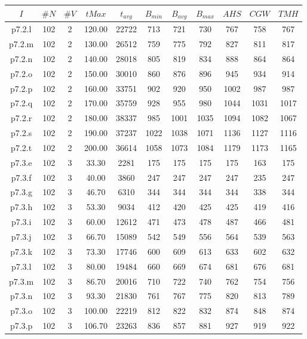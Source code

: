 \begin{center}
\begin{tabular}{ |c|c|c|c|c|c|c|c|c|c|c| } 
\hline
$I$ & $\#N$ & $\#V$ & $tMax$ & $t_{avg}$ & $B_{min}$ & $B_{avg}$ & $B_{max}$ & $AHS$ & $CGW$ & $TMH$\\
\hline
p7.2.l & 102 & 2 & 120.00 & 22722 & 713 & 721 & 730 & 767 & 758 & 767  \\
p7.2.m & 102 & 2 & 130.00 & 26512 & 759 & 775 & 792 & 827 & 811 & 817  \\
p7.2.n & 102 & 2 & 140.00 & 28018 & 805 & 819 & 834 & 888 & 864 & 864  \\
p7.2.o & 102 & 2 & 150.00 & 30010 & 860 & 876 & 896 & 945 & 934 & 914  \\
p7.2.p & 102 & 2 & 160.00 & 33751 & 902 & 920 & 950 & 1002 & 987 & 987  \\
p7.2.q & 102 & 2 & 170.00 & 35759 & 928 & 955 & 980 & 1044 & 1031 & 1017  \\
p7.2.r & 102 & 2 & 180.00 & 38337 & 985 & 1001 & 1035 & 1094 & 1082 & 1067  \\
p7.2.s & 102 & 2 & 190.00 & 37237 & 1022 & 1038 & 1071 & 1136 & 1127 & 1116  \\
p7.2.t & 102 & 2 & 200.00 & 36614 & 1058 & 1073 & 1084 & 1179 & 1173 & 1165  \\
p7.3.e & 102 & 3 & 33.30 & 2281 & 175 & 175 & 175 & 175 & 163 & 175  \\
p7.3.f & 102 & 3 & 40.00 & 3860 & 247 & 247 & 247 & 247 & 235 & 247  \\
p7.3.g & 102 & 3 & 46.70 & 6310 & 344 & 344 & 344 & 344 & 338 & 344  \\
p7.3.h & 102 & 3 & 53.30 & 9034 & 412 & 420 & 425 & 425 & 419 & 416  \\
p7.3.i & 102 & 3 & 60.00 & 12612 & 471 & 473 & 478 & 487 & 466 & 481  \\
p7.3.j & 102 & 3 & 66.70 & 15089 & 542 & 549 & 556 & 564 & 539 & 563  \\
p7.3.k & 102 & 3 & 73.30 & 17746 & 600 & 609 & 613 & 633 & 602 & 632  \\
p7.3.l & 102 & 3 & 80.00 & 19484 & 660 & 669 & 674 & 681 & 676 & 681  \\
p7.3.m & 102 & 3 & 86.70 & 20016 & 710 & 722 & 740 & 762 & 754 & 756  \\
p7.3.n & 102 & 3 & 93.30 & 21830 & 761 & 767 & 775 & 820 & 813 & 789  \\
p7.3.o & 102 & 3 & 100.00 & 22219 & 812 & 822 & 832 & 874 & 848 & 874  \\
p7.3.p & 102 & 3 & 106.70 & 23263 & 836 & 857 & 881 & 927 & 919 & 922  \\

\end{tabular}
\end{center}
